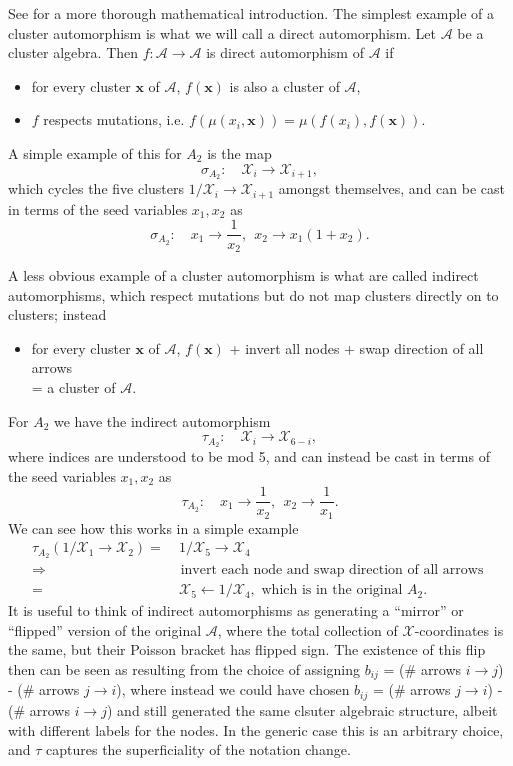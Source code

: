 \documentclass[11pt]{article}
\def\nl{\nonumber\\}
\def\nn{\nonumber}
\def\x{\mathcal{X}}
\def\a{\mathcal{A}}
\begin{document}
See \cite{Chang:2015} for a more thorough mathematical introduction. The simplest example of a cluster automorphism is what we will call a direct automorphism. Let $\a$ be a cluster algebra. Then $f: \a \to \a$ is direct automorphism of $\a$ if
\begin{itemize}
  \item for every cluster $\mathbf{x}$ of $\a$, $f(\mathbf{x})$ is also a cluster of $\a$,
  \item $f$ respects mutations, i.e. $f(\mu(x_i,\mathbf{x})) = \mu(f(x_i),f(\mathbf{x}))$.
 \end{itemize} 
A simple example of this for $A_2$ is the map
\begin{equation}
  \sigma_{A_2}:\quad \mathcal{X}_i \to \mathcal{X}_{i+1},
\end{equation}
which cycles the five clusters $1/\x_i\to \x_{i+1}$ amongst themselves, and can be cast in terms of the seed variables $x_1, x_2$ as 
\begin{equation}
  \sigma_{A_2}:\quad x_1\to \frac{1}{x_2},~~ x_2\to x_1(1+x_2).
\end{equation}

A less obvious example of a cluster automorphism is what are called indirect automorphisms, which respect mutations but do not map clusters directly on to clusters; instead
\begin{itemize}
  \item for every cluster $\mathbf{x}$ of $\a$, $f(\mathbf{x})$ + invert all nodes + swap direction of all arrows\\ = a cluster of $\a$.
\end{itemize}
For $A_2$ we have the indirect automorphism
\begin{equation}
  \tau_{A_2}:\quad \mathcal{X}_i \to \mathcal{X}_{6-i},
\end{equation}
where indices are understood to be mod 5, and can instead be cast in terms of the seed variables $x_1, x_2$ as
\begin{equation}
  \tau_{A_2}:\quad x_1 \to \frac{1}{x_2}, ~~x_2 \to \frac{1}{x_1}.
\end{equation}
We can see how this works in a simple example
\begin{align}
  \tau_{A_2}(1/\x_1 \to \x_2) =&~1/\x_5 \to \x_4 \nl
  \Rightarrow &\text{ invert each node and swap direction of all arrows }\\ 
  =&~\x_5 \leftarrow 1/\x_4, \text{ which is in the original $A_2$}.\nn
\end{align}
It is useful to think of indirect automorphisms as generating a ``mirror'' or ``flipped'' version of the original $\a$, where the total collection of $\x$-coordinates is the same, but their Poisson bracket has flipped sign. The existence of this flip then can be seen as resulting from the choice of assigning $b_{ij}$ = (\# arrows $i\to j$) - (\# arrows $j \to i$), where instead we could have chosen $b_{ij}$ = (\# arrows $j \to i$) - (\# arrows $i\to j$) and still generated the same clsuter algebraic structure, albeit with different labels for the nodes. In the generic case this is an arbitrary choice, and $\tau$ captures the superficiality of the notation change.
\end{document}
